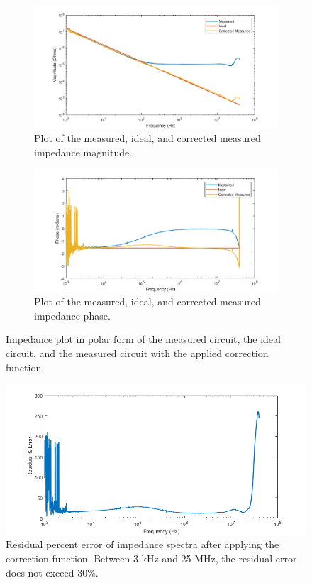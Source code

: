 \begin{figure}[h]
\centering
\begin{subfigure}[b]{\textwidth}
    \centering
    \includegraphics[width=\textwidth]{images/CorrectedImpedanceMag.png}
    \caption{Plot of the measured, ideal, and corrected measured impedance magnitude.}
\end{subfigure}
\begin{subfigure}[b]{\textwidth}
    \centering
    \includegraphics[width=\textwidth]{images/CorrectedImpedancePhase.png}
    \caption{Plot of the measured, ideal, and corrected measured impedance phase.}
\end{subfigure}
\caption{Impedance plot in polar form of the measured circuit, the ideal circuit, and the measured circuit with the applied correction function.}
\label{fig:IS_validation_corrected_spectra_comp}
\end{figure}

\begin{figure}[t]
    \centering
    \includegraphics[width=\textwidth]{images/residualPercentError.png}
    \caption{Residual percent error of impedance spectra after applying the correction function. Between 3 kHz and 25 MHz, the residual error does not exceed 30$\%$.}
    \label{fig:IS_residual_error}
\end{figure}

